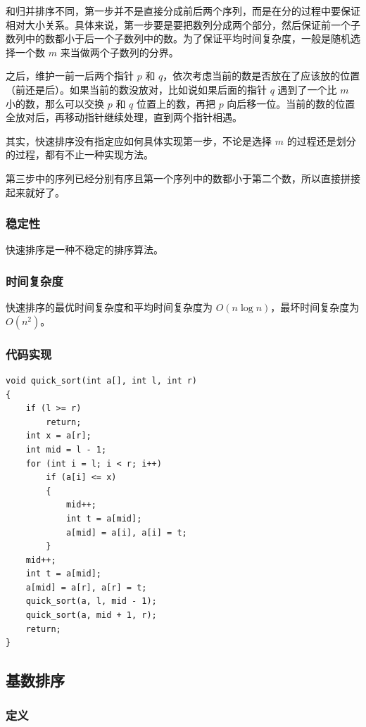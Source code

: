 \documentclass[12pt]{article}
\begin{document}
和归并排序不同，第一步并不是直接分成前后两个序列，而是在分的过程中要保证相对大小关系。具体来说，第一步要是要把数列分成两个部分，然后保证前一个子数列中的数都小于后一个子数列中的数。为了保证平均时间复杂度，一般是随机选择一个数 $m$ 来当做两个子数列的分界。

之后，维护一前一后两个指针 $p$ 和 $q$，依次考虑当前的数是否放在了应该放的位置（前还是后）。如果当前的数没放对，比如说如果后面的指针 $q$ 遇到了一个比 $m$ 小的数，那么可以交换 $p$ 和 $q$ 位置上的数，再把 $p$ 向后移一位。当前的数的位置全放对后，再移动指针继续处理，直到两个指针相遇。

其实，快速排序没有指定应如何具体实现第一步，不论是选择 $m$ 的过程还是划分的过程，都有不止一种实现方法。

第三步中的序列已经分别有序且第一个序列中的数都小于第二个数，所以直接拼接起来就好了。

\subsubsection{稳定性}
快速排序是一种不稳定的排序算法。

\subsubsection{时间复杂度}

快速排序的最优时间复杂度和平均时间复杂度为 $O(n\log n)$，最坏时间复杂度为 $O(n^2)$。

\subsubsection{代码实现}

{\setmainfont{Consolas} %
\begin{lstlisting}
void quick_sort(int a[], int l, int r)
{
    if (l >= r)
        return;
    int x = a[r];
    int mid = l - 1;
    for (int i = l; i < r; i++)
        if (a[i] <= x)
        {
            mid++;
            int t = a[mid];
            a[mid] = a[i], a[i] = t;
        }
    mid++;
    int t = a[mid];
    a[mid] = a[r], a[r] = t;
    quick_sort(a, l, mid - 1);
    quick_sort(a, mid + 1, r);
    return;
}
\end{lstlisting}
}

\subsection{基数排序}

\subsubsection{定义}
\end{document}
